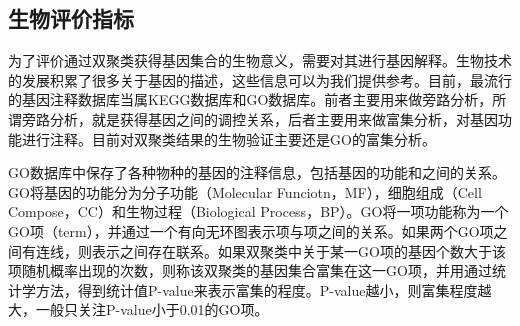   \subsection{生物评价指标}
  为了评价通过双聚类获得基因集合的生物意义，需要对其进行基因解释。生物技术的发展积累了很多关于基因的描述，这些信息可以为我们提供参考。目前，最流行的基因注释数据库当属KEGG数据库和GO数据库。前者主要用来做旁路分析，所谓旁路分析，就是获得基因之间的调控关系，后者主要用来做富集分析，对基因功能进行注释。目前对双聚类结果的生物验证主要还是GO的富集分析。

  GO数据库中保存了各种物种的基因的注释信息，包括基因的功能和之间的关系。GO将基因的功能分为分子功能（Molecular Funciotn，MF），细胞组成（Cell Compose，CC）和生物过程（Biological Process，BP）。GO将一项功能称为一个GO项（term），并通过一个有向无环图表示项与项之间的关系。如果两个GO项之间有连线，则表示之间存在联系。如果双聚类中关于某一GO项的基因个数大于该项随机概率出现的次数，则称该双聚类的基因集合富集在这一GO项，并用通过统计学方法，得到统计值P-value来表示富集的程度。P-value越小，则富集程度越大，一般只关注P-value小于0.01的GO项。  
